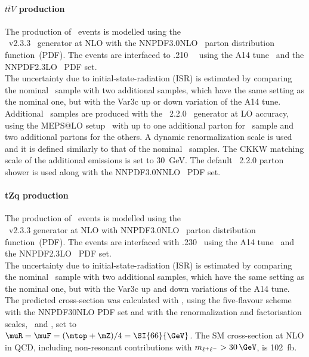 \paragraph{$t\bar{t}V$ production} 
The production of \ttV\ events is modelled using the\\
\mgamc~v2.3.3~\cite{Alwall:2014hca} generator at NLO with the
\textsc{NNPDF3.0NLO}~\cite{Ball:2014uwa} parton distribution function~(PDF).
The events are interfaced to \pythia.210~\cite{Sjostrand:2014zea}~
using the A14 tune~\cite{ATL-PHYS-PUB-2014-021} and the
\textsc{NNPDF2.3LO}~\cite{Ball:2014uwa} PDF set.\\ 
The uncertainty due to initial-state-radiation (ISR) is estimated by
comparing the nominal \ttV\ sample with two additional samples, which
have the same setting as the nominal one, but with the Var3c up or down
variation of the A14 tune.  
Additional \ttV\ samples are produced with the
\sherpa~2.2.0~\cite{Bothmann:2019yzt} generator at LO accuracy, using
the MEPS@LO setup~\cite{Catani:2001cc,Hoeche:2009rj} with up to one
additional parton for \ttll\ sample and two additional partons for the
others. A dynamic renormalization scale is used and it is defined
similarly to that of the nominal \ttV\ samples. The CKKW matching
scale of the additional emissions is set to 30~GeV. The default
\sherpa~2.2.0 parton shower is used along with the
\textsc{NNPDF3.0NNLO}~\cite{Ball:2014uwa} PDF set.

\paragraph{tZq production}
The production of \tZq\ events is modelled using the\\ \mgamc~v2.3.3 \cite{Alwall:2014hca}
generator at NLO with \textsc{NNPDF3.0NLO}~\cite{Ball:2014uwa} parton distribution function~(PDF).
The events are interfaced with \pythia.230~\cite{Sjostrand:2014zea} using the A14 tune~\cite{ATL-PHYS-PUB-2014-021} and the \textsc{NNPDF2.3LO}~\cite{Ball:2014uwa} PDF set.\\
The uncertainty due to initial-state-radiation (ISR) is estimated by comparing the nominal \tZq\ sample with two additional samples,
which have the same setting as the nominal one, but with the Var3c up and down variations of the A14 tune. 
The predicted cross-section was calculated with , using the five-flavour scheme with the \textsc{NNPDF30NLO} PDF set and with the renormalization and factorisation scales, \muR\ and \muF, set to\\ \mbox{$\muR = \muF = (\mtop + \mZ)/4 = \SI{66}{\GeV}$.} The SM \tZq cross-section at NLO in QCD, including non-resonant contributions with $m_{\ell^+\ell^-} > 30\,\GeV$, is \SI{102}{fb}.

